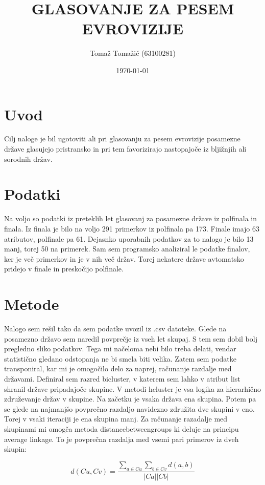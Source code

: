 \documentclass[a4paper,11pt]{article}
\title{GLASOVANJE ZA PESEM EVROVIZIJE}
\author{Tomaž Tomažič (63100281)}
\date{\today}
\begin{document}
\maketitle

\section{Uvod}

Cilj naloge je bil ugotoviti ali pri glasovanju za pesem evrovizije posamezne države glasujejo pristransko in pri tem favorizirajo nastopajoče iz bljižnjih ali sorodnih držav.

\section{Podatki}

Na voljo so podatki iz preteklih let glasovanj za posamezne države iz polfinala in finala. Iz finala je bilo na voljo 291 primerkov iz polfinala pa 173. Finale imajo 63 atributov, polfinale pa 61. Dejasnko uporabnih podatkov za to nalogo je bilo 13 manj, torej 50 na primerek.
Sam sem programsko analiziral le podatke finalov, ker je več primerkov in je v nih več držav. Torej nekatere države avtomatsko pridejo v finale in preskočijo polfinale.

\section{Metode}

Nalogo sem rešil tako da sem podatke uvozil iz .csv datoteke. Glede na posamezno državo sem naredil povprečje iz vseh let skupaj. S tem sem dobil bolj pregledno sliko podatkov. Tega mi načeloma nebi bilo treba delati, vendar statistično gledano odstopanja ne bi smela biti velika.
Zatem sem podatke transponiral, kar mi je omogočilo delo za naprej, računanje razdalje med državami. Definiral sem razred bicluster, v katerem sem lahko v atribut list shranil države pripadajoče skupine. V metodi hcluster je vsa logika za hierarhično združevanje držav v skupine. Na začetku je vsaka država ena skupina. Potem pa se glede na najmanjšo povprečno razdaljo navidezno združita dve skupini v eno. Torej v vsaki iteraciji je ena skupina manj. Za računanje razadalje med skupinami mi omogča metoda distancebetweengroups ki deluje na principu average linkage. To je povprečna razdalja med vsemi pari primerov iz dveh skupin:

\begin{equation} 
d(Cu,Cv)= 
\frac{\sum\limits_{a\in Cu} \sum\limits_{b\in Cv} d(a, b)}
{|Ca||Cb|} 
\end{equation}
\end{document}
